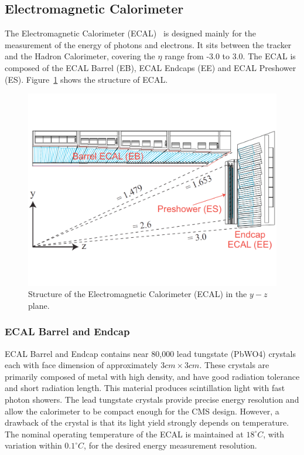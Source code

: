 \subsection{Electromagnetic Calorimeter} 
The Electromagnetic Calorimeter (ECAL)~\cite{lhc_ecaldesign} is designed mainly for the measurement of the energy of photons and electrons. It sits between the tracker and the Hadron Calorimeter, covering the $\eta$ range from -3.0 to 3.0. The ECAL is composed of the ECAL Barrel (EB), ECAL Endcaps (EE) and ECAL Preshower (ES). Figure~\ref{fig:lhc_ecal} shows the structure of ECAL.
\begin{figure}[htbp]
\begin{center}
\includegraphics[width=0.7\linewidth]{figures/lhc_ecal.pdf}
\caption{Structure of the Electromagnetic Calorimeter (ECAL) in the $y-z$ plane.}
\label{fig:lhc_ecal}
\end{center}
\end{figure}

\subsubsection{ECAL Barrel and Endcap}
ECAL Barrel and Endcap contains near 80,000 lead tungstate (PbWO4) crystals each with face dimension of approximately $3cm\times 3cm$. These crystals are primarily composed of metal with high density, and have good radiation tolerance and short radiation length. This material produces scintillation light with fast photon showers. The lead tungstate crystals provide precise energy resolution and allow the calorimeter to be compact enough for the CMS design. However, a drawback of the crystal is that its light yield strongly depends on temperature. The nominal operating temperature of the ECAL is maintained at $18^{\circ}C$, with variation within $0.1^{\circ}C$, for the desired energy measurement resolution. 

